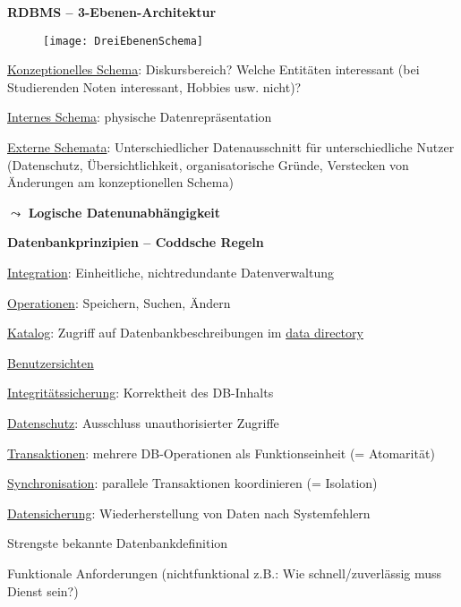 \textbf{RDBMS -- 3-Ebenen-Architektur}
\begin{figure}[H]\centering\label{DreiEbenenSchema}\texttt{[image: DreiEbenenSchema]}\end{figure}
\begin{items}
  \item \underline{Konzeptionelles Schema}: Diskursbereich? Welche Entitäten interessant (bei Studierenden Noten interessant, Hobbies usw. nicht)?
  \item \underline{Internes Schema}: physische Datenrepräsentation
  \item \underline{Externe Schemata}: Unterschiedlicher Datenausschnitt für unterschiedliche Nutzer (Datenschutz, Übersichtlichkeit, organisatorische Gründe, Verstecken von Änderungen am konzeptionellen Schema)
  \item \( \leadsto \) \textbf{Logische Datenunabhängigkeit}
\end{items}

\newpage

\textbf{Datenbankprinzipien -- Coddsche Regeln}
\begin{enumeration}
  \item \underline{Integration}: Einheitliche, nichtredundante Datenverwaltung
  \item \underline{Operationen}: Speichern, Suchen, Ändern
  \item \underline{Katalog}: Zugriff auf Datenbankbeschreibungen im \underline{data directory}
  \item \underline{Benutzersichten}
  \item \underline{Integritätssicherung}: Korrektheit des DB-Inhalts
  \item \underline{Datenschutz}: Ausschluss unauthorisierter Zugriffe
  \item \underline{Transaktionen}: mehrere DB-Operationen als Funktionseinheit (= Atomarität)
  \item \underline{Synchronisation}: parallele Transaktionen koordinieren (= Isolation)
  \item \underline{Datensicherung}: Wiederherstellung von Daten nach Systemfehlern
\end{enumeration}
\begin{items}
  \item Strengste bekannte Datenbankdefinition
  \item Funktionale Anforderungen (nichtfunktional z.B.: Wie schnell/zuverlässig muss Dienst sein?)
\end{items}

